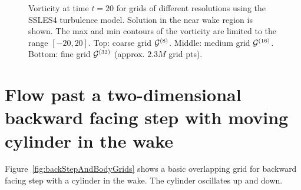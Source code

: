 \documentclass[11pt]{article}
\begin{document}
{
\begin{figure}[hbt]
\newcommand{\figWidth}{11cm}
\newcommand{\trimfig}[2]{\trimFigb{#1}{#2}{0.0}{.0}{.33}{.33}}
\begin{center}\small
\caption{
Vorticity at time $t=20$ for grids of different resolutions using the SSLES4 turbulence model.
Solution in the near wake region is shown. The max and min contours of the vorticity are limited to the range $[-20,20]$.
Top: coarse grid ${\mathcal G}^{(8)}$. Middle: medium grid ${\mathcal G}^{(16)}$. Bottom: fine grid ${\mathcal G}^{(32)}$ (approx. $2.3M$ grid pts).  
}
\label{fig:backStepResolutions}
\end{center}
\end{figure}
}


\clearpage
\section{Flow past a two-dimensional backward facing step with moving cylinder in the wake}

Figure~\ref{fig:backStepAndBodyGrids} shows a basic overlapping grid for backward facing step
with a cylinder in the wake. The cylinder oscillates up and down. 
\end{document}
